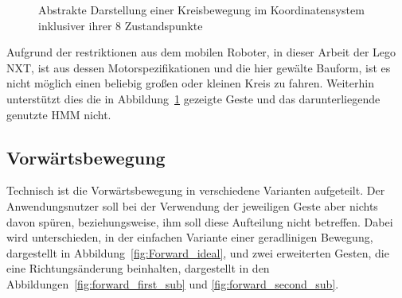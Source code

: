 \begin{figure}[htb]
\centering
{}
\caption[Abstrakte Darstellung einer Kreisbewegung im Koordinatensystem inklusiver ihrer 8 Zustandspunkte]{Abstrakte Darstellung einer Kreisbewegung im Koordinatensystem inklusiver ihrer 8 Zustandspunkte}
\label{fig:Circle_ideal}
\end{figure}

Aufgrund der restriktionen aus dem mobilen Roboter, in dieser Arbeit der Lego NXT, ist aus dessen Motorspezifikationen und die hier gew\"alte Bauform, ist es nicht m\"oglich einen beliebig gro\ss en oder kleinen Kreis zu fahren. Weiterhin unterst\"utzt dies die in Abbildung~\ref{fig:Circle_ideal} gezeigte Geste und das darunterliegende genutzte \gls{HMM} nicht.

\subsection{Vorw\"artsbewegung}
Technisch ist die Vorw\"artsbewegung in verschiedene Varianten aufgeteilt. Der Anwendungsnutzer soll bei der Verwendung der jeweiligen Geste aber nichts davon sp\"uren, beziehungsweise, ihm soll diese Aufteilung nicht betreffen.
\newline
Dabei wird unterschieden, in der einfachen Variante einer geradlinigen Bewegung, dargestellt in Abbildung~\ref{fig:Forward_ideal}, und zwei erweiterten Gesten, die eine Richtungs\"anderung beinhalten, dargestellt in den Abbildungen~\ref{fig:forward_first_sub} und \ref{fig:forward_second_sub}.

